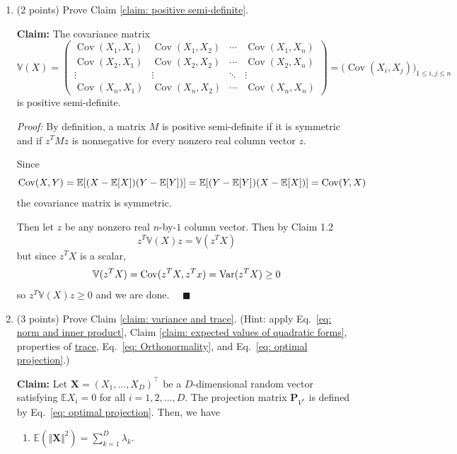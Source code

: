 \documentclass[11pt,letterpaper, leqno]{article}
\numberwithin{equation}{section}
\numberwithin{theorem}{section}
\numberwithin{lemma}{section}
\numberwithin{corollary}{section}
\numberwithin{definition}{section}
\numberwithin{proposition}{section}
\numberwithin{remark}{section}
\numberwithin{example}{section}
\newcommand{\Var}{{\rm Var}}            %
\newcommand{\Cov}{{\rm Cov}}            %
\newcommand{\T}{\intercal}
\newcommand{\E}{\mathbb{E}}
\renewcommand{\qed}{\quad \blacksquare}
\newcommand{\V}{\mathbb{V}}
\begin{document}
\begin{enumerate}
    \item (2 points) Prove Claim \ref{claim: positive semi-definite}.
    
        \color{blue}
            \textbf{Claim:} The covariance matrix 
            \[\V(X) = \begin{pmatrix}
                \operatorname{Cov}(X_1,X_1) & \operatorname{Cov}(X_1,X_2) & \cdots & \operatorname{Cov}(X_1,X_n) \\
                \operatorname{Cov}(X_2,X_1) & \operatorname{Cov}(X_2,X_2) & \cdots & \operatorname{Cov}(X_2,X_n) \\
                \vdots & \vdots & \ddots & \vdots \\
                \operatorname{Cov}(X_n,X_1) & \operatorname{Cov}(X_n,X_2) & \cdots & \operatorname{Cov}(X_n,X_n)
            \end{pmatrix}
            =\Big(\operatorname{Cov}(X_i,X_j)\Big)_{1\le i,j\le n}\] 
            is positive semi-definite.
        
            \emph{Proof:} By definition, a matrix $M$ is positive semi-definite if it is symmetric and if $z^T Mz$ is nonnegative for every nonzero real column vector $z$. 

            Since
            \[\Cov(X, Y) = \E[(X - \E[X])(Y - \E[Y])] = \E[(Y - \E[Y])(X - \E[X])] = \Cov(Y, X)\]
            the covariance matrix is symmetric.

            Then let $z$ be any nonzero real $n$-by-$1$ column vector. Then by Claim 1.2
            \[z^T \V(X) z = \V(z^TX)\]
            but since $z^TX$ is a scalar, 
            \[\V(z^TX) = \Cov(z^TX, z^Tx) = \Var(z^TX) \geq 0\]
            so $z^T \V(X) z \geq 0$ and we are done. $\qed$

        \color{black}   
    
    \item (3 points) Prove Claim \ref{claim: variance and trace}. (Hint: apply Eq.~\eqref{eq: norm and inner product}, Claim \ref{claim: expected values of quadratic forms}, properties of \href{https://en.wikipedia.org/wiki/Trace_(linear_algebra)}{trace}, Eq.~\eqref{eq: Orthonormality}, and Eq.~\eqref{eq: optimal projection}.)

        \color{blue}
            \textbf{Claim:} Let $\boldsymbol{X}=(X_1,\ldots,X_D)^\T$ be a $D$-dimensional random vector satisfying $\mathbb{E}X_i=0$ for all $i=1,2,\ldots,D$. The projection matrix $\boldsymbol{P}_{V^*}$ is defined by Eq.~\eqref{eq: optimal projection}. Then, we have
            \begin{enumerate}
                \item $\mathbb{E}\left(\Vert \boldsymbol{X}\Vert^2\right) = \sum_{k=1}^D \lambda_k$.
        

\end{enumerate}
\end{enumerate}
\end{document}
